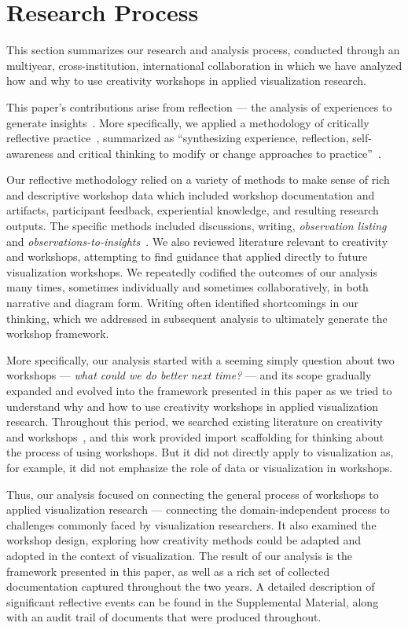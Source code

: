 \section{Research Process}
\label{sec:research-process}

This section summarizes our research and analysis process, conducted through an multiyear, cross-institution, international collaboration in which we have analyzed how and why to use creativity workshops in applied visualization research.

This paper’s contributions arise from reflection — the analysis of experiences to generate insights~\cite{Boud1985}. More specifically, we applied a methodology of critically reflective practice~\cite{Brookfield1998}, summarized as “synthesizing experience, reflection, self-awareness and critical thinking to modify or change approaches to practice”~\cite{Thompson2008}.

Our reflective methodology relied on a variety of methods to make sense of rich and descriptive workshop data which included workshop documentation and artifacts, participant feedback, experiential knowledge, and resulting research outputs. The specific methods included discussions, writing, {\it observation listing} and {\it observations-to-insights}~\cite{Kumar2012}. We also reviewed literature relevant to creativity and workshops, attempting to find guidance that applied directly to future visualization workshops. We repeatedly codified the outcomes of our analysis many times, sometimes individually and sometimes collaboratively, in both narrative and diagram form. Writing often identified shortcomings in our thinking, which we addressed in subsequent analysis to ultimately generate the workshop framework. 

More specifically, our analysis started with a seeming simply question about two workshops --- {\it what could we do better next time?} --- and its scope gradually expanded and evolved into the framework presented in this paper as we tried to understand why and how to use creativity workshops in applied visualization research.  Throughout this period, we searched existing literature on creativity and workshops~\cite{Biskjaer2017,CreativeEducationFoundation2015,DeBono1983,Gordon1961,Hamilton2016,Miller1989,Nickerson1999,Osborn1953,Sawyer2003,Sawyer2006,Shneiderman2005}, and this work provided import scaffolding for thinking about the process of using workshops. But it did not directly apply to visualization as, for example, it did not emphasize the role of data or visualization in workshops. 

Thus, our analysis focused on connecting the general process of workshops to applied visualization research --- connecting the domain-independent process to challenges commonly faced by visualization researchers. It also examined the workshop design, exploring how creativity methods could be adapted and adopted in the context of visualization. The result of our analysis is the framework presented in this paper, as well as a rich set of collected documentation captured throughout the two years. A detailed description of significant reflective events can be found in the Supplemental Material, along with an audit trail of documents that were produced throughout. 